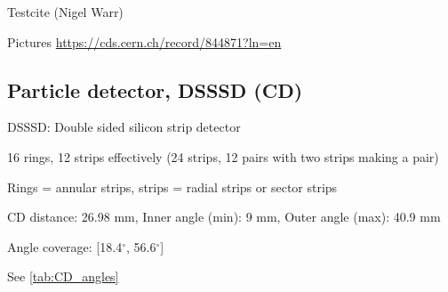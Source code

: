 \documentclass[twoside,english]{uiofysmaster/uiofysmaster}
\begin{document}
Testcite (Nigel Warr) \cite{NWarr}


Pictures \url{https://cds.cern.ch/record/844871?ln=en}

\subsection{Particle detector, DSSSD (CD)}

DSSSD: Double sided silicon strip detector

16 rings, 12 strips effectively (24 strips, 12 pairs with two strips making a pair)

Rings = annular strips, strips = radial strips or sector strips

CD distance: 26.98 mm, Inner angle (min): 9 mm, Outer angle (max): 40.9 mm

Angle coverage: [18.4$^\circ$, 56.6$^\circ$]

See \autoref{tab:CD_angles}
\end{document}

